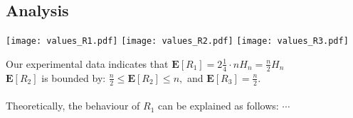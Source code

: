 \documentclass{tufte-handout}
\begin{document}
\subsection{Analysis}

\texttt{[image: values\_R1.pdf]}
\texttt{[image: values\_R2.pdf]}
\texttt{[image: values\_R3.pdf]}

Our experimental data indicates that $\mathbf E [R_1] = 2\frac{1}{4}\cdot
nH_n = \frac{n}{2}H_n$ \\
$\mathbf E[R_2]$ is bounded by: $ \frac{n}{2} \le \mathbf E[R_2] \le n ,$
and $\mathbf E[R_3] = \frac{n}{2}$.
\\
\
\\

Theoretically, the behaviour of $R_1$ can be explained as follows:
$\cdots$
\end{document}
